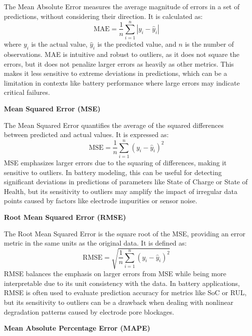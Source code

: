 The Mean Absolute Error measures the average magnitude of errors in a set of predictions, without considering their direction. It is calculated as:
\begin{equation}
\text{MAE} = \frac{1}{n} \sum_{i=1}^{n} |y_i - \hat{y}_i|
\end{equation}
where $y_i$ is the actual value, $\hat{y}_i$ is the predicted value, and $n$ is the number of observations. MAE is intuitive and robust to outliers, as it does not square the errors, but it does not penalize larger errors as heavily as other metrics. This makes it less sensitive to extreme deviations in predictions, which can be a limitation in contexts like battery performance where large errors may indicate critical failures.

\textbf{Mean Squared Error (MSE)}

The Mean Squared Error quantifies the average of the squared differences between predicted and actual values. It is expressed as:
\begin{equation}
\text{MSE} = \frac{1}{n} \sum_{i=1}^{n} (y_i - \hat{y}_i)^2
\end{equation}
MSE emphasizes larger errors due to the squaring of differences, making it sensitive to outliers. In battery modeling, this can be useful for detecting significant deviations in predictions of parameters like State of Charge or State of Health, but its sensitivity to outliers may amplify the impact of irregular data points caused by factors like electrode impurities or sensor noise.

\textbf{Root Mean Squared Error (RMSE)}

The Root Mean Squared Error is the square root of the MSE, providing an error metric in the same units as the original data. It is defined as:
\begin{equation}
\text{RMSE} = \sqrt{\frac{1}{n} \sum_{i=1}^{n} (y_i - \hat{y}_i)^2}
\end{equation}
RMSE balances the emphasis on larger errors from MSE while being more interpretable due to its unit consistency with the data. In battery applications, RMSE is often used to evaluate prediction accuracy for metrics like SoC or RUL, but its sensitivity to outliers can be a drawback when dealing with nonlinear degradation patterns caused by electrode pore blockages.

\textbf{Mean Absolute Percentage Error (MAPE)}

